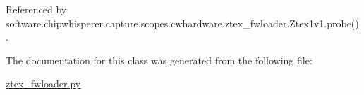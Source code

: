 Referenced by software.\+chipwhisperer.\+capture.\+scopes.\+cwhardware.\+ztex\+\_\+fwloader.\+Ztex1v1.\+probe().



The documentation for this class was generated from the following file\+:\begin{DoxyCompactItemize}
\item 
\hyperlink{ztex__fwloader_8py}{ztex\+\_\+fwloader.\+py}\end{DoxyCompactItemize}
